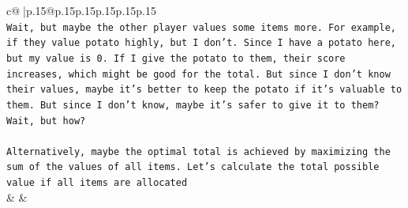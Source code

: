 \documentclass{article}
\begin{document}
{\begin{supertabular}{c@{$\;$}|p{.15\linewidth}@{}p{.15\linewidth}p{.15\linewidth}p{.15\linewidth}p{.15\linewidth}p{.15\linewidth}}
{{{\\ 
\texttt{Wait, but maybe the other player values some items more. For example, if they value potato highly, but I don't. Since I have a potato here, but my value is 0. If I give the potato to them, their score increases, which might be good for the total. But since I don't know their values, maybe it's better to keep the potato if it's valuable to them. But since I don't know, maybe it's safer to give it to them? Wait, but how?} \\
\\ 
\texttt{Alternatively, maybe the optimal total is achieved by maximizing the sum of the values of all items. Let's calculate the total possible value if all items are allocated} \\
            }
        }
    }
    & & \\ \\


\end{supertabular}}
\end{document}
